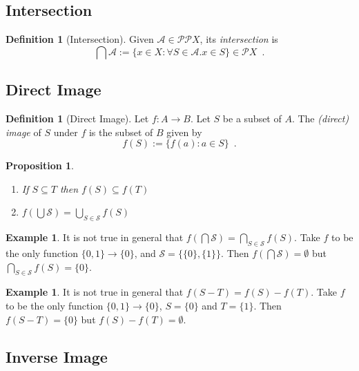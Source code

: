 \documentclass{book}
\newtheorem{prop}[ax]{Proposition}
\theoremstyle{definition}
\newtheorem{df}[ax]{Definition}
\newtheorem{ex}[ax]{Example}
\begin{document}
\subsection{Intersection} %

\begin{df}[Intersection]
Given $\mathcal{A} \in \mathcal{P} \mathcal{P} X$, its \emph{intersection} is
\[ \bigcap \mathcal{A} := \{ x \in X : \forall S \in \mathcal{A}. x \in S \} \in \mathcal{P} X \enspace . \]
\end{df}

\subsection{Direct Image} %

\begin{df}[Direct Image]
Let $f : A \rightarrow B$. Let $S$ be a subset of $A$. The \emph{(direct) image} of $S$ under $f$ is the subset of $B$ given by
\[ f(S) := \{ f(a) : a \in S \} \enspace . \]
\end{df}

\begin{prop}
$ $
\begin{enumerate}
\item If $S \subseteq T$ then $f(S) \subseteq f(T)$
\item $f(\bigcup \mathcal{S}) = \bigcup_{S \in \mathcal{S}} f(S)$
\end{enumerate}
\end{prop}

\begin{ex}
It is not true in general that $f(\bigcap \mathcal{S}) = \bigcap_{S \in \mathcal{S}} f(S)$. Take $f$ to be the only function $\{0,1\} \rightarrow \{0\}$, and $\mathcal{S} = \{\{0\},\{1\}\}$. Then $f(\bigcap \mathcal{S}) = \emptyset$ but $\bigcap_{S \in \mathcal{S}} f(S) = \{0\}$.
\end{ex}

\begin{ex}
It is not true in general that $f(S - T) = f(S) - f(T)$. Take $f$ to be the only function $\{0,1\} \rightarrow \{0\}$, $S = \{0\}$ and $T = \{1\}$. Then $f(S-T) = \{0\}$ but $f(S) - f(T) = \emptyset$.
\end{ex}

\subsection{Inverse Image} %
\end{document}
